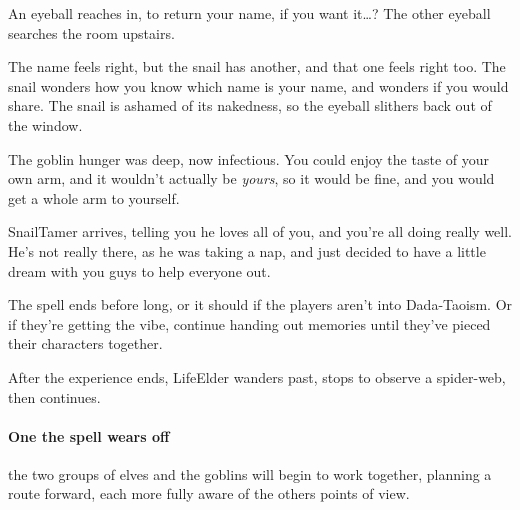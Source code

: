 \begin{multicols}{2}
\begin{boxtext}
    An eyeball reaches in, to return your name, if you want it\ldots ?
    The other eyeball searches the room upstairs.

    The name feels right, but the snail has another, and that one feels right too.
    The snail wonders how you know which name is your name, and wonders if you would share.
    The snail is ashamed of its nakedness, so the eyeball slithers back out of the window.

    The goblin hunger was deep, now infectious.
    You could enjoy the taste of your own arm, and it wouldn't actually be \emph{yours}, so it would be fine, and you would get a whole arm to yourself.

    \Gls{SnailTamer} arrives, telling you he loves all of you, and you're all doing really well.
    He's not really there, as he was taking a nap, and just decided to have a little dream with you guys to help everyone out.

\end{boxtext}

The spell ends before long, or it should if the players aren't into Dada-Taoism.
Or if they're getting the vibe, continue handing out memories until they've pieced their characters together.

After the experience ends, \gls{LifeElder} wanders past, stops to observe a spider-web, then continues.

\paragraph{One the spell wears off}
the two groups of elves and the goblins will begin to work together, planning a route forward, each more fully aware of the others points of view.

\iftoggle{verbose}{
  \subsection{Broken Resolutions}

  If your table runs out of time for the night, and you need to wrap everything up quickly, switch to \gls{downtime} plans, and give each \gls{pc} \pgls{action}.
  If they want to negotiate with \gls{MindElder}, they might roll \roll{Intelligence}{Empathy}, or if they think it's time to kill those \glspl{ogre}, sleeping in their sepulchres.

  For some added drama, ask each player to roll under a cup, napkin, or sleeve.
  Leave the \gls{natural} hidden until everyone has decided what they want to do.
  One all results are in, determine the outcomes based entirely on the rolls.
  If \pgls{pc} spent the entire \gls{downtime} trying to redirect the river through \gls{shadepaths}, it could \gls{flood} the \gls{sunway} and block snails from accessing \gls{ravencops}.
  Or if they spent their time trying to kill \glspl{ogre}, a failed roll could mean that \pgls{ogre} eats the \gls{pc} alive before marauding around \gls{ravencops}.
}{

}
\end{multicols}
